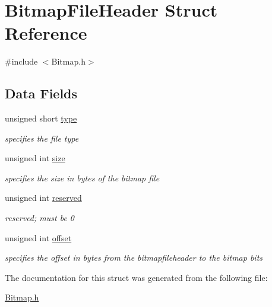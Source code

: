 \hypertarget{struct_bitmap_file_header}{}\section{Bitmap\+File\+Header Struct Reference}
\label{struct_bitmap_file_header}


{\ttfamily \#include $<$Bitmap.\+h$>$}

\subsection*{Data Fields}
\begin{DoxyCompactItemize}
\item 
unsigned short \hyperlink{group___bitmap_gaa929142c5ddf34cf0915c97a617a1a63}{type}
\begin{DoxyCompactList}\small\item\em specifies the file type \end{DoxyCompactList}\item 
unsigned int \hyperlink{group___bitmap_gaac913b3a1f6ef005d66bf7a84428773e}{size}
\begin{DoxyCompactList}\small\item\em specifies the size in bytes of the bitmap file \end{DoxyCompactList}\item 
unsigned int \hyperlink{group___bitmap_ga05d5cbcb44f437341bd9fa37d589aced}{reserved}
\begin{DoxyCompactList}\small\item\em reserved; must be 0 \end{DoxyCompactList}\item 
unsigned int \hyperlink{group___bitmap_ga29b5297d3393519050e3126c4cb07c1c}{offset}
\begin{DoxyCompactList}\small\item\em specifies the offset in bytes from the bitmapfileheader to the bitmap bits \end{DoxyCompactList}\end{DoxyCompactItemize}


The documentation for this struct was generated from the following file\+:\begin{DoxyCompactItemize}
\item 
\hyperlink{_bitmap_8h}{Bitmap.\+h}\end{DoxyCompactItemize}
